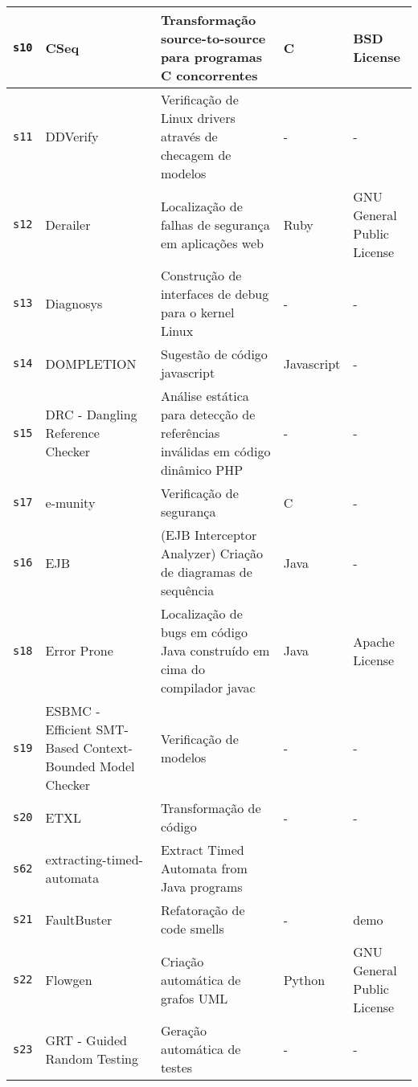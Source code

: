 \begin{longtable}{| l | p{4.5cm} | p{7cm} | p{2.5cm} | p{2.5cm} |}
    \hline
    \texttt{s10} &
      CSeq &
      Transformação source-to-source para programas C concorrentes &
      C &
      BSD License \\
    \hline
    \texttt{s11} &
      DDVerify &
      Verificação de Linux drivers através de checagem de modelos &
      - &
      - \\
    \hline
    \texttt{s12} &
      Derailer &
      Localização de falhas de segurança em aplicações web &
      Ruby &
      GNU General Public License \\
    \hline
    \texttt{s13} &
      Diagnosys &
      Construção de interfaces de debug para o kernel Linux &
      - &
      - \\
    \hline
    \texttt{s14} &
      DOMPLETION &
      Sugestão de código javascript &
      Javascript &
      - \\
    \hline
    \texttt{s15} &
      DRC - Dangling Reference Checker &
      Análise estática para detecção de referências inválidas em código dinâmico PHP &
      - &
      - \\
    \hline
    \texttt{s17} &
      e-munity &
      Verificação de segurança &
      C &
      - \\
    \hline
    \texttt{s16} &
      EJB &
      (EJB Interceptor Analyzer) Criação de diagramas de sequência &
      Java &
      - \\
    \hline
    \texttt{s18} &
      Error Prone &
      Localização de bugs em código Java construído em cima do compilador javac &
      Java &
      Apache License \\
    \hline
    \texttt{s19} &
      ESBMC - Efficient SMT-Based Context-Bounded Model Checker &
      Verificação de modelos &
      - &
      - \\
    \hline
    \texttt{s20} &
      ETXL &
      Transformação de código &
      - &
      - \\
    \hline
    \texttt{s62} &
      extracting-timed-automata &
      Extract Timed Automata from Java programs &
       &
       \\
    \hline
    \texttt{s21} &
      FaultBuster &
      Refatoração de code smells &
      - &
      demo \\
    \hline
    \texttt{s22} &
      Flowgen &
      Criação automática de grafos UML &
      Python &
      GNU General Public License \\
    \hline
    \texttt{s23} &
      GRT - Guided Random Testing &
      Geração automática de testes &
      - &
      - \\

\end{longtable}
